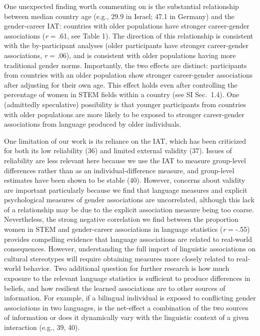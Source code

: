 \documentclass[9pt,twocolumn]{pnas-new}
\begin{document}
One unexpected finding worth commenting on is the substantial relationship between median country age (e.g., 29.9 in Israel; 47.1 in Germany) and the gender-career IAT: countries with older populations have stronger career-gender associations (\emph{r} = .61, see Table 1). The direction of this relationship is consistent with the by-participant analyses (older participants have stronger career-gender associations, \emph{r} = .06), and is consistent with older populations having more traditional gender norms. Importantly, the two effects are distinct: participants from countries with an older population show stronger career-gender associations after adjusting for their own age. This effect holds even after controlling the percentage of women in STEM fields within a country (see SI Sec.\ 1.4). One (admittedly speculative) possibility is that younger participants from countries with older populations are more likely to be exposed to stronger career-gender associations from language produced by older individuals.  



One limitation of our work is its reliance on the IAT, which has been criticized for both its low reliability (36) and limited external validity (37). Issues of reliability are less relevant here because we use the IAT to measure group-level differences rather than as an individual-difference measure, and group-level estimates have been shown to be stable (40). However, concerns about validity are important particularly because we find that language measures and explicit psychological measures of gender associations are uncorrelated, although this lack of a relationship may be due to the explicit association measure being too coarse. Nevertheless, the strong negative correlation we find between the proportion women in STEM and gender-career associations in language statistics (\emph{r} = -.55) provides compelling evidence that language associations are related to real-world consequences. However, understanding the full import of linguistic associations on cultural stereotypes will require obtaining measures more closely related to real-world behavior. Two additional question for further research is how much exposure to the relevant language statistics is sufficient to produce differences in beliefs, and how resilient the learned associations are to other sources of information. For example, if a bilingual individual is exposed to conflicting gender associations in two languages, is the net-effect a combination of the two sources of information or does it dynamically vary with the linguistic context of a given interaction (e.g., 39, 40).
\end{document}
